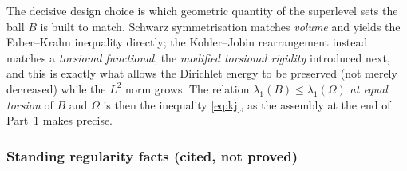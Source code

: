\documentclass[11pt]{amsart}
\theoremstyle{definition}
\newcommand{\Om}{\Omega}
\begin{document}
The decisive design choice is which geometric quantity of the superlevel
sets the ball $B$ is built to match. Schwarz symmetrisation matches
\emph{volume} and yields the Faber--Krahn inequality directly; the
Kohler--Jobin rearrangement instead matches a \emph{torsional functional},
the \emph{modified torsional rigidity} introduced next, and this is exactly
what allows the Dirichlet energy to be preserved (not merely decreased)
while the $L^2$ norm grows. The relation $\lambda_1(B)\le\lambda_1(\Om)$
\emph{at equal torsion} of $B$ and $\Om$ is then the inequality
\eqref{eq:kj}, as the assembly at the end of Part~1 makes precise.

\subsubsection*{Standing regularity facts (cited, not proved)}
\end{document}
